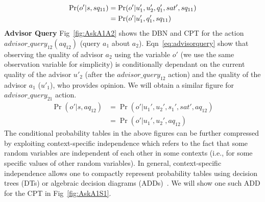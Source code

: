 \documentclass{aamas2014}
\begin{document}
 \begin{equation}
 \centering
\begin{split}
\Pr(o'|s,sq_{11})& =\Pr(o'|u_1',u_2',q_1',sat',sq_{11})\\
& =\Pr(o'|u_1',q_1',sq_{11})
\end{split}
 \label{eq:sellerquery}
\end{equation}
\textbf{Advisor Query} Fig~\ref{fig:AskA1A2} shows the DBN and CPT for the action $advisor\_query_{12} (aq_{12})$ (query $a_1$ about $a_2$).  Eqn~\ref{eq:advisorquery} show that observing the quality of advisor $a_2$ using the variable $o'$ (we use the same observation variable for simplicity) is conditionally dependant on the current quality of the advisor $u'_2$ (after the $advisor\_query_{12}$ action) and the quality of the advisor $a_1$ ($u'_1$), who provides opinion. We will obtain a similar figure for $advisor\_query_{21}$ action.
\begin{equation}
\begin{split}
\Pr(o'|s,aq_{12})&=\Pr(o'|u_1',u_2',s_1',sat',aq_{12})\\
&=\Pr(o'|u_1',u_2',aq_{12})
\end{split}
 \label{eq:advisorquery}
\end{equation}
The conditional probability tables in the above figures can be further compressed by exploiting context-specific independence which refers to the fact that some random variables are independent of each other in some contexts (i.e., for some specific values of other random variables). In general, context-specific independence allows one to compactly represent probability tables using decision trees (DTs) or algebraic decision diagrams (ADDs)~\cite{boutilier1996context}. We will show one such ADD for the CPT in Fig~\ref{fig:AskA1S1}.
\end{document}
